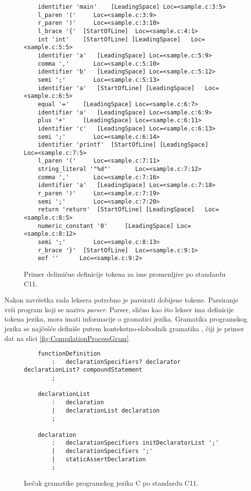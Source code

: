 \begin{figure}[h!]
    \begin{lstlisting}
    identifier 'main'	 [LeadingSpace]	Loc=<sample.c:3:5>
    l_paren '('		Loc=<sample.c:3:9>
    r_paren ')'		Loc=<sample.c:3:10>
    l_brace '{'	 [StartOfLine]	Loc=<sample.c:4:1>
    int 'int'	 [StartOfLine] [LeadingSpace]	Loc=<sample.c:5:5>
    identifier 'a'	 [LeadingSpace]	Loc=<sample.c:5:9>
    comma ','		Loc=<sample.c:5:10>
    identifier 'b'	 [LeadingSpace]	Loc=<sample.c:5:12>
    semi ';'		Loc=<sample.c:5:13>
    identifier 'a'	 [StartOfLine] [LeadingSpace]	Loc=<sample.c:6:5>
    equal '='	 [LeadingSpace]	Loc=<sample.c:6:7>
    identifier 'a'	 [LeadingSpace]	Loc=<sample.c:6:9>
    plus '+'	 [LeadingSpace]	Loc=<sample.c:6:11>
    identifier 'c'	 [LeadingSpace]	Loc=<sample.c:6:13>
    semi ';'		Loc=<sample.c:6:14>
    identifier 'printf'	 [StartOfLine] [LeadingSpace]	Loc=<sample.c:7:5>
    l_paren '('		Loc=<sample.c:7:11>
    string_literal '"%d"'		Loc=<sample.c:7:12>
    comma ','		Loc=<sample.c:7:16>
    identifier 'a'	 [LeadingSpace]	Loc=<sample.c:7:18>
    r_paren ')'		Loc=<sample.c:7:19>
    semi ';'		Loc=<sample.c:7:20>
    return 'return'	 [StartOfLine] [LeadingSpace]	Loc=<sample.c:8:5>
    numeric_constant '0'	 [LeadingSpace]	Loc=<sample.c:8:12>
    semi ';'		Loc=<sample.c:8:13>
    r_brace '}'	 [StartOfLine]	Loc=<sample.c:9:1>
    eof ''		Loc=<sample.c:9:2>
    \end{lstlisting}
    \caption{Primer delimične definicije tokena za ime promenljive po standardu C11.}
    \label{fig:CompilationProcessLex}
\end{figure}

Nakon završetka rada leksera potrebno je parsirati dobijene tokene.
Parsiranje vrši program koji se naziva \emph{parser}. Parser, slično
kao što lekser ima definicije tokena jezika, mora imati informacije 
o gramatici jezika. Gramatika programskog jezika se najčešće definiše
putem kontekstno-slobodnih gramatika \cite{ContextFreeGrammars}, 
čiji je primer dat na slici \ref{fig:CompilationProcessGram}.

\begin{figure}[h!]
    \begin{lstlisting}
    functionDefinition
        :   declarationSpecifiers? declarator declarationList? compoundStatement
        ;

    declarationList
        :   declaration
        |   declarationList declaration
        ;

    declaration
        :   declarationSpecifiers initDeclaratorList ';'
        | 	declarationSpecifiers ';'
        |   staticAssertDeclaration
        ;
    \end{lstlisting}
    \caption{Isečak gramatike programskog jezika C po standardu C11.}
    \label{fig:CompilationProcessLex}
\end{figure}


